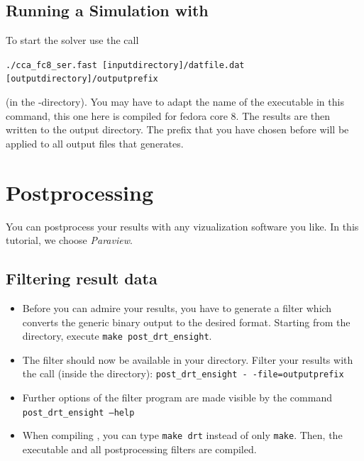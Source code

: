 \subsection{Running a Simulation with \baci{}}
\label{tut_fluid_preexo:baci}
To start the solver use the call 
\begin{center}
	\verb|./cca_fc8_ser.fast [inputdirectory]/datfile.dat [outputdirectory]/outputprefix|
\end{center}
(in the \baci{}-directory). You may have to adapt the name of the executable 
in this command, this one here is compiled for fedora core 8. The results are 
then written to the output directory. The prefix that you have chosen before will 
be applied to all output files that \baci{} generates.




\section{Postprocessing}

You can postprocess your results with any vizualization software you like. In this tutorial, we choose \emph{Paraview}. 

\subsection{Filtering result data}
\begin{itemize}
\item Before you can admire your results, you have to generate a filter 
which converts the generic binary \baci{} output to the desired format.
Starting from the \baci{} directory, execute \texttt{make post\_drt\_ensight}.
\item The filter should now be available in your \baci{} directory. Filter your results with
the call (inside the \baci{} directory): \texttt{post\_drt\_ensight -\,-file=outputprefix} 
\item Further options of the filter program are made visible by the command \texttt{post\_drt\_ensight --help}
\item When compiling \baci{}, you can type \texttt{make drt} instead of only \texttt{make}. Then, the \baci{} executable 
and all postprocessing filters are compiled.
\end{itemize}

